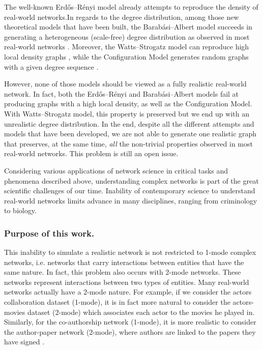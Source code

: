 \documentclass[table]{report}
\begin{document}
\medbreak

The well-known Erdős–Rényi model already attempts to reproduce the density of real-world networks.In regards to the degree distribution, among those new theoretical models that have been built, the Barabási–Albert model succeeds in generating a heterogeneous (scale-free) degree distribution as observed in most real-world networks \cite{barabasi}. Moreover, the Watts–Strogatz model can reproduce high local density graphs \cite{watts_strogatz}, while the Configuration Model generates random graphs with a given degree sequence \cite{newman}.

However, none of those models should be viewed as a fully realistic real-world network. In fact, both the Erdős–Rényi and  Barabási–Albert models fail at producing graphs with a high local density, as well as the Configuration Model. With Watts–Strogatz model, this property is preserved but we end up with an unrealistic degree distribution. In the end, despite all the different attempts and models that have been developed, we are not able to generate one realistic graph that preserves, at the same time, \textit{all} the non-trivial properties observed in most real-world networks. This problem is still an open issue.

\medbreak


Considering various applications of network science in critical tasks and phenomena described above, understanding complex networks is part of the great scientific challenges of our time. Inability of contemporary science to understand real-world networks limits advance in many disciplines, ranging from criminology to biology. 



\subsubsection{Purpose of this work.}
\medbreak

\bigbreak

This inability to simulate a realistic network is not restricted to 1-mode complex networks, i.e. networks that carry interactions between entities that have the same nature. In fact, this problem also occurs with 2-mode networks. These networks represent interactions between two types of entities. Many real-world networks actually have a 2-mode nature. For example, if we consider the actors collaboration dataset (1-mode), it is in fact more natural to consider the actors-movies dataset (2-mode) which associates each actor to the movies he played in. Similarly, for the co-authorship network (1-mode), it is more realistic to consider the author-paper network (2-mode), where authors are linked to the papers they have signed \cite{latapy}. 
\end{document}
